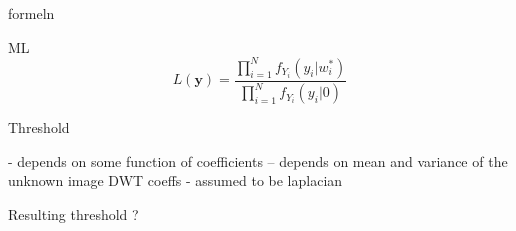 formeln

ML
\[
L(\bm y) = \frac{\prod\limits_{i=1}^N f_{Y_i}(y_i|w_i^*)}{\prod\limits_{i=1}^N f_{Y_i}(y_i|0)}
\]

Threshold

- depends on some function of coefficients
-- depends on mean and variance of the unknown image DWT coeffs - assumed to be laplacian

Resulting threshold ?